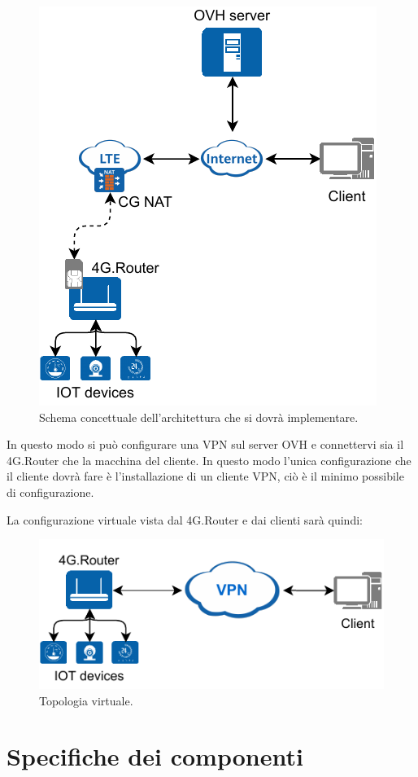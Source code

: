 \begin{figure}[H]
	\centering
	\includegraphics[width=0.5\linewidth]{immagini/diag-real}
	\caption{Schema concettuale dell'architettura che si dovrà implementare. \cite{icons}}

	\label{fig:schem_architettura_reale}

\end{figure}

In questo modo si può configurare una VPN sul server OVH e connettervi sia il 4G.Router che la macchina del cliente. 
In questo modo l'unica configurazione che il cliente dovrà fare è l'installazione di un cliente VPN, ciò è il minimo possibile di configurazione.

La configurazione virtuale vista dal 4G.Router e dai clienti sarà quindi:

\begin{figure}[H]
	\centering
	\includegraphics[width=0.5\linewidth]{immagini/diag-virtual}
	\caption{Topologia virtuale. \cite{icons}}

	\label{fig:schema_architettura_virtuale}

\end{figure}

\section{Specifiche dei componenti}

